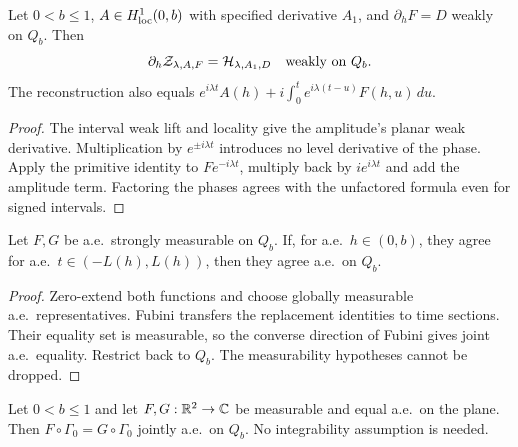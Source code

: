 \begin{lemma}
\label{lem:quarter-reconstruction-weak}
\leanok
Let $0<b\le1$, $A\in H^1_{\rm loc}(0,b)$ with specified derivative $A_1$,
and $\partial_hF=D$ weakly on $Q_b$. Then
\[
 \partial_h\mathcal Z_{\lambda,A,F}
   =\mathcal H_{\lambda,A_1,D}
 \quad\hbox{weakly on }Q_b.
\]
The reconstruction also equals
$e^{i\lambda t}A(h)+i\int_0^te^{i\lambda(t-u)}F(h,u)\,du$.
\end{lemma}

\begin{proof}
\leanok
The interval weak lift and locality give the amplitude's planar weak
derivative. Multiplication by $e^{\pm i\lambda t}$ introduces no level
derivative of the phase. Apply the primitive identity to
$F e^{-i\lambda t}$, multiply back by $i e^{i\lambda t}$ and add the
amplitude term. Factoring the phases agrees with the unfactored formula
even for signed intervals.
\end{proof}

\begin{lemma}
\label{lem:quarter-profile-ae}
\leanok
Let $F,G$ be a.e.\ strongly measurable on $Q_b$.
If, for a.e.\ $h\in(0,b)$, they agree for a.e.\
$t\in(-L(h),L(h))$, then they agree a.e.\ on $Q_b$.
\end{lemma}

\begin{proof}
\leanok
Zero-extend both functions and choose globally measurable a.e.\
representatives. Fubini transfers the replacement identities to time
sections. Their equality set is measurable, so the converse direction
of Fubini gives joint a.e.\ equality. Restrict back to $Q_b$.
The measurability hypotheses cannot be dropped.
\end{proof}

\begin{lemma}
\label{lem:quarter-ae-pullback}
\uses{def:cell-separatrix-collar}
\leanok
Let $0<b\le1$ and let $F,G:\mathbb{R}^2\to\mathbb{C}$ be measurable and equal
a.e.\ on the plane. Then $F\circ\Gamma_0=G\circ\Gamma_0$ jointly
a.e.\ on $Q_b$. No integrability assumption is needed.
\end{lemma}

